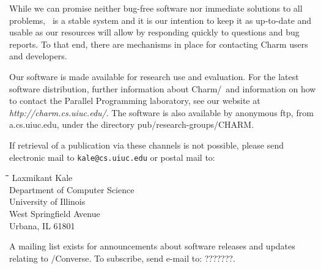 While we can promise neither bug-free software nor immediate solutions   
to all problems, \charmpp\ is a stable system and it is our intention to
keep it as up-to-date and usable as our resources will allow
by responding quickly to questions and bug reports.  To that
end, there are mechanisms in place for contacting Charm users
and developers. 

Our software is made available for research use and evaluation.
For the latest software distribution, further information about {\sc
Charm}/\charmpp\ and information on how to contact the Parallel
Programming laboratory, see our website at {\it
http://charm.cs.uiuc.edu/}.  The software is also available by
anonymous ftp, from a.cs.uiuc.edu, under the directory
pub/research-groups/CHARM.  

If retrieval of a publication via these channels is not possible,
please send electronic mail to {\tt kale@cs.uiuc.edu} or postal mail to:

{\bf 
\begin{tabbing}
\hspace{0.5in}\=\hspace{0.3in}\=\hspace{0.3in}\=\hspace{0.3in}\= \kill
\> Laxmikant Kale \\
\> Department of Computer Science \\
\> University of Illinois \\
 West Springfield Avenue \\
\> Urbana, IL 61801 \\
\end{tabbing}
}

A mailing list exists for announcements about software releases and
updates relating to \charmpp/{\sc Converse}.  To subscribe, send
e-mail to: ???????.
